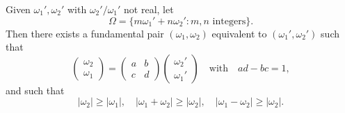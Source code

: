 Given $\omega_1', \omega_2'$ with $\omega_2'/\omega_1'$ not real, let
$$\Omega = \{m\omega_1' + n\omega_2' : m, n \text{ integers}\}.$$
Then there exists a fundamental pair $(\omega_1, \omega_2)$ equivalent to $(\omega_1', \omega_2')$ such that
$$\begin{pmatrix} \omega_2 \\ \omega_1 \end{pmatrix} = \begin{pmatrix} a & b \\ c & d \end{pmatrix} \begin{pmatrix} \omega_2' \\ \omega_1' \end{pmatrix} \quad \text{with} \quad ad - bc = 1,$$
and such that
$$|\omega_2| \geq |\omega_1|, \quad |\omega_1 + \omega_2| \geq |\omega_2|, \quad |\omega_1 - \omega_2| \geq |\omega_2|.$$
